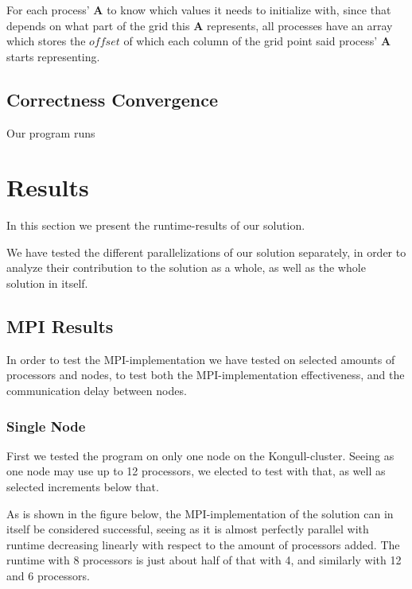 \documentclass[fontsize=11pt,paper=a4,titlepage]{article}
\begin{document}
For each process' $\mathbf{A}$ to know which values it needs to initialize with,
since that depends on what part of the grid this $\mathbf{A}$ represents, all
processes have an array which stores the $offset$ of which each column of the
grid point said process' $\mathbf{A}$ starts representing.

\subsection{Correctness Convergence}

Our program runs


\section{Results}

In this section we present the runtime-results of our solution.

We have tested the different parallelizations of our solution separately, in
order to analyze their contribution to the solution as a whole, as well as the
whole solution in itself.

\subsection{MPI Results}

In order to test the MPI-implementation we have tested on selected amounts of
processors and nodes, to test both the MPI-implementation effectiveness, and the
communication delay between nodes.

\subsubsection{Single Node}

First we tested the program on only one node on the Kongull-cluster. Seeing as
one node may use up to 12 processors, we elected to test with that, as well as
selected increments below that.

As is shown in the figure below, the MPI-implementation of the
solution can in itself be considered successful, seeing as it is almost
perfectly parallel with runtime decreasing linearly with respect to the amount
of processors added. The runtime with 8 processors is just about half of that
with 4, and similarly with 12 and 6 processors.
\end{document}

